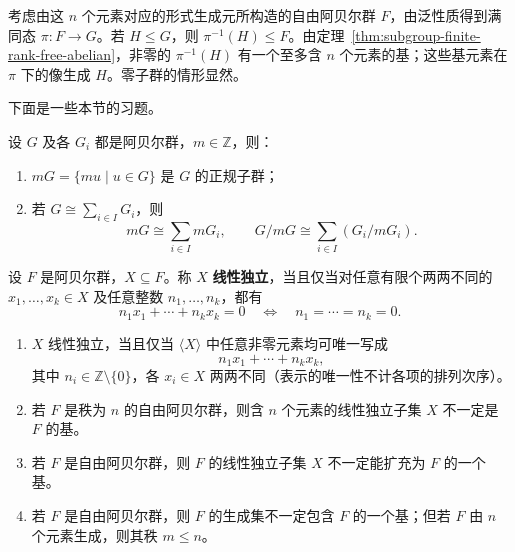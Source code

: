 \begin{purpleproof}
考虑由这 $n$ 个元素对应的形式生成元所构造的自由阿贝尔群 $F$，由泛性质得到满同态 $\pi:F\to G$。若 $H\leq G$，则 $\pi^{-1}(H)\leq F$。由定理~\ref{thm:subgroup-finite-rank-free-abelian}，非零的 $\pi^{-1}(H)$ 有一个至多含 $n$ 个元素的基；这些基元素在 $\pi$ 下的像生成 $H$。零子群的情形显然。
\end{purpleproof}

下面是一些本节的习题。

\begin{proposition}\label{prop:multiples-and-direct-sums}
设 $G$ 及各 $G_i$ 都是阿贝尔群，$m\in\mathbb Z$，则：
\begin{enumerate}[label=(\arabic*)]
  \item $mG=\{mu\mid u\in G\}$ 是 $G$ 的正规子群；
  \item 若 $G\cong\sum_{i\in I}G_i$，则
  \[
    mG\cong\sum_{i\in I}mG_i,
    \qquad
    G/mG\cong\sum_{i\in I}(G_i/mG_i).
  \]
\end{enumerate}
\end{proposition}

\begin{example}[线性独立与基]\label{ex:abelian-independence-and-bases}
设 $F$ 是阿贝尔群，$X\subseteq F$。称 $X$ \textbf{线性独立}，当且仅当对任意有限个两两不同的 $x_1,\ldots,x_k\in X$ 及任意整数 $n_1,\ldots,n_k$，都有
\[
  n_1x_1+\cdots+n_kx_k=0
  \quad\Longleftrightarrow\quad n_1=\cdots=n_k=0.
\]
\begin{enumerate}[label=(\arabic*)]
  \item $X$ 线性独立，当且仅当 $\langle X\rangle$ 中任意非零元素均可唯一写成
  \[
    n_1x_1+\cdots+n_kx_k,
  \]
  其中 $n_i\in\mathbb Z\setminus\{0\}$，各 $x_i\in X$ 两两不同（表示的唯一性不计各项的排列次序）。
  \item 若 $F$ 是秩为 $n$ 的自由阿贝尔群，则含 $n$ 个元素的线性独立子集 $X$ 不一定是 $F$ 的基。
  \item 若 $F$ 是自由阿贝尔群，则 $F$ 的线性独立子集 $X$ 不一定能扩充为 $F$ 的一个基。
  \item 若 $F$ 是自由阿贝尔群，则 $F$ 的生成集不一定包含 $F$ 的一个基；但若 $F$ 由 $n$ 个元素生成，则其秩 $m\leq n$。
\end{enumerate}
\end{example}

